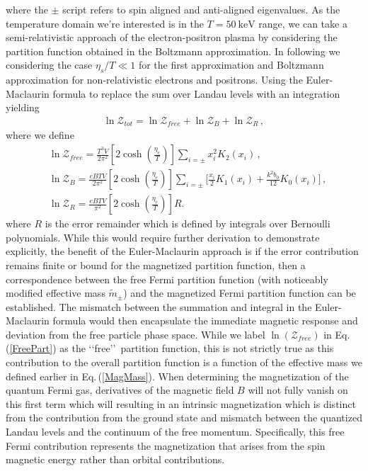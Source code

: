 \documentclass[universe,article,submit,moreauthors,pdftex,a4paper]{Definitions/mdpi}
\newcommand{\req}[1]{Eq.\,(\ref{#1})}
\begin{document}
where the $\pm$ script refers to spin aligned and anti-aligned eigenvalues. As the temperature domain we're interested is in the $T=50\ \mathrm{keV}$ range, we can take a semi-relativistic approach of the electron-positron plasma by considering the partition function obtained in the Boltzmann approximation. In following we considering the case $\eta_s/T\ll1$ for the first approximation and Boltzmann approximation for non-relativistic electrons and positrons. Using the Euler-Maclaurin formula to replace the sum over Landau levels with an integration yielding
\begin{align}
  \ln\mathcal{Z}_{tot}=\ln\mathcal{Z}_{free}+\ln\mathcal{Z}_B+\ln\mathcal{Z}_R\,,
\end{align}
where we define 
\begin{align}
  \label{FreePart}&\ln\mathcal{Z}_{free}=\frac{T^3V}{2\pi^2}\left[2\cosh{\left(\frac{\eta_{e}}{T}\right)}\right]\sum_{i=\pm}x_i^2K_2\left(x_i\right)\,,\\
  \label{MagPart}&\ln\mathcal{Z}_B=\frac{eBTV}{2\pi^2}\left[2\cosh{\left(\frac{\eta_{e}}{T}\right)}\right]\sum_{i=\pm}\bigg[\frac{x_i}{2}K_1\left(x_i\right)+\frac{k^2b_0}{12}K_0\left(x_i\right)\bigg]\,,\\
  \label{ErrorPart}&\ln\mathcal{Z}_R=\frac{eBTV}{\pi^2}\left[2\cosh{\left(\frac{\eta_{e}}{T}\right)}\right]R.
\end{align}
where $R$ is the error remainder which is defined by integrals over Bernoulli polynomials.
While this would require further derivation to demonstrate explicitly, the benefit of the Euler-Maclaurin approach is if the error contribution remains finite or bound for the magnetized partition function, then a correspondence between the free Fermi partition function (with noticeably modified effective mass $\tilde{m}_{\pm}$) and the magnetized Fermi partition function can be established. The mismatch between the summation and integral in the Euler-Maclaurin formula would then encapsulate the immediate magnetic response and deviation from the free particle phase space. While we label $\ln(\mathcal{Z}_{free})$ in \req{FreePart} as the \lq\lq free\rq\rq\ partition function, this is not strictly true as this contribution to the overall partition function is a function of the effective mass we defined earlier in \req{MagMass}. When determining the magnetization of the quantum Fermi gas, derivatives of the magnetic field $B$ will not fully vanish on this first term which will resulting in an intrinsic magnetization which is distinct from the contribution from the ground state and mismatch between the quantized Landau levels and the continuum of the free momentum. Specifically, this free Fermi contribution represents the magnetization that arises from the spin magnetic energy rather than orbital contributions.
\end{document}
